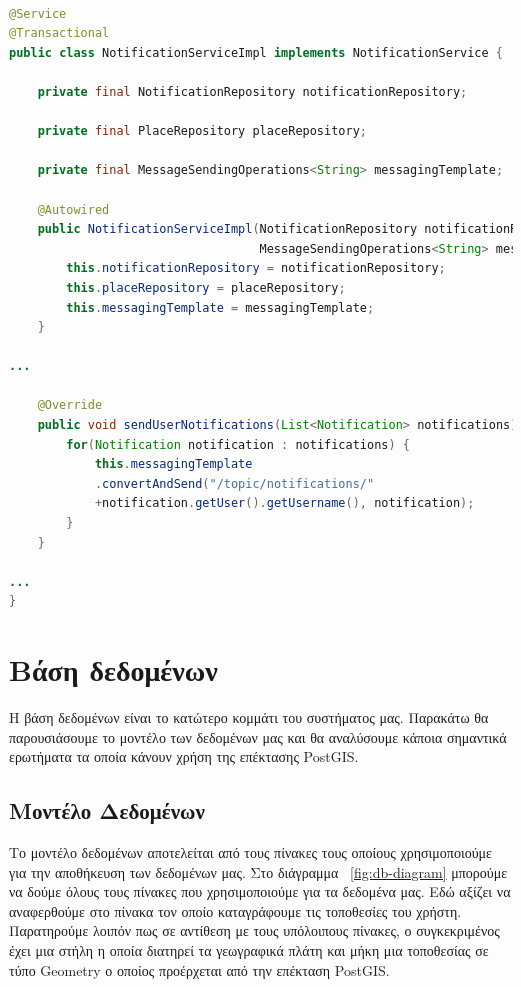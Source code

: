  \begin{lstlisting}[language=Java, caption=Δημοσίευση ειδοποιήσεων, label={lst:websocket-publish}]

@Service
@Transactional
public class NotificationServiceImpl implements NotificationService {

    private final NotificationRepository notificationRepository;

    private final PlaceRepository placeRepository;

    private final MessageSendingOperations<String> messagingTemplate;

    @Autowired
    public NotificationServiceImpl(NotificationRepository notificationRepository, PlaceRepository placeRepository,
                                   MessageSendingOperations<String> messagingTemplate) {
        this.notificationRepository = notificationRepository;
        this.placeRepository = placeRepository;
        this.messagingTemplate = messagingTemplate;
    }

...

    @Override
    public void sendUserNotifications(List<Notification> notifications) {
        for(Notification notification : notifications) {
            this.messagingTemplate
            .convertAndSend("/topic/notifications/"
            +notification.getUser().getUsername(), notification);
        }
    }

...
}
\end{lstlisting}

\section{Βάση δεδομένων}
Η βάση δεδομένων είναι το κατώτερο κομμάτι του συστήματος μας. Παρακάτω θα παρουσιάσουμε το μοντέλο των δεδομένων μας και θα αναλύσουμε κάποια σημαντικά ερωτήματα τα οποία κάνουν χρήση της επέκτασης PostGIS.


\subsection{Μοντέλο Δεδομένων}
Το μοντέλο δεδομένων αποτελείται από τους πίνακες τους οποίους χρησιμοποιούμε για την αποθήκευση των δεδομένων μας. Στο διάγραμμα ~\ref{fig:db-diagram} μπορούμε να δούμε όλους τους πίνακες που χρησιμοποιούμε για τα δεδομένα μας. Εδώ αξίζει να αναφερθούμε στο πίνακα τον οποίο καταγράφουμε τις τοποθεσίες του χρήστη. Παρατηρούμε λοιπόν πως σε αντίθεση με τους υπόλοιπους πίνακες, ο συγκεκριμένος έχει μια στήλη η οποία διατηρεί τα γεωγραφικά πλάτη και μήκη μια τοποθεσίας σε τύπο Geometry ο οποίος προέρχεται από την επέκταση PostGIS.

